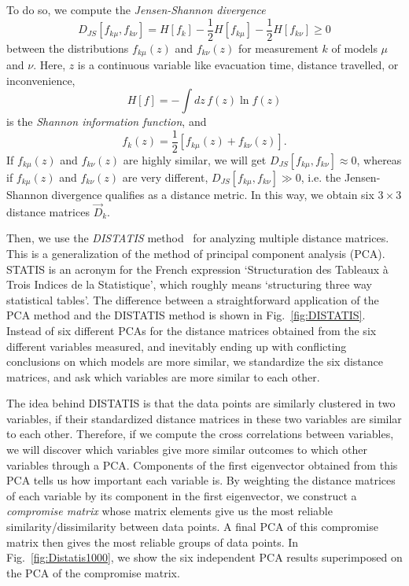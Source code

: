 To do so, we compute the \emph{Jensen-Shannon divergence}~\cite{Lin:1991it}
\begin{equation}
D_{JS}[f_{k\mu}, f_{k\nu}] = H[f_k] - \frac{1}{2} H[f_{k\mu}] - \frac{1}{2} H[f_{k\nu}] \geq 0
\end{equation}
between the distributions $f_{k\mu}(z)$ and $f_{k\nu}(z)$ for measurement $k$ of models $\mu$ and $\nu$. Here, $z$ is a continuous variable like evacuation time, distance travelled, or inconvenience,
\begin{equation}
H[f] = -\int dz\, f(z) \ln f(z)
\end{equation}
is the \emph{Shannon information function}, and
\begin{equation}
f_k(z) = \frac{1}{2}\left[f_{k\mu}(z) + f_{k\nu}(z)\right].
\end{equation}
If $f_{k\mu}(z)$ and $f_{k\nu}(z)$ are highly similar, we will get $D_{JS}[f_{k\mu}, f_{k\nu}] \approx 0$, whereas if $f_{k\mu}(z)$ and $f_{k\nu}(z)$ are very different, $D_{JS}[f_{k\mu}, f_{k\nu}] \gg 0$, i.e. the Jensen-Shannon divergence qualifies as a distance metric. In this way, we obtain six $3 \times 3$ distance matrices $\vec{D}_k$.

Then, we use the \emph{DISTATIS} method~\cite{Abdi:DISTATIS} for analyzing multiple distance matrices. This is a generalization of the method of principal component analysis (PCA). STATIS is an acronym for the French expression `Structuration des Tableaux \`{a} Trois Indices de la Statistique', which roughly means `structuring three way statistical tables'. The difference between a straightforward application of the PCA method and the DISTATIS method is shown in Fig.~\ref{fig:DISTATIS}. Instead of six different PCAs for the distance matrices obtained from the six different variables measured, and inevitably ending up with conflicting conclusions on which models are more similar, we standardize the six distance matrices, and ask which variables are more similar to each other.

The idea behind DISTATIS is that the data points are similarly clustered in two variables, if their standardized distance matrices in these two variables are similar to each other. Therefore, if we compute the cross correlations between variables, we will discover which variables give more similar outcomes to which other variables through a PCA. Components of the first eigenvector obtained from this PCA tells us how important each variable is. By weighting the distance matrices of each variable by its component in the first eigenvector, we construct a \emph{compromise matrix} whose matrix elements give us the most reliable similarity/dissimilarity between data points. A final PCA of this compromise matrix then gives the most reliable groups of data points. In Fig.~\ref{fig:Distatis1000}, we show the six independent PCA results superimposed on the PCA of the compromise matrix.

